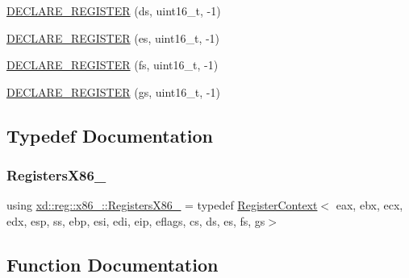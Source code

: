 \begin{DoxyCompactItemize}
\item 
\mbox{\hyperlink{namespacexd_1_1reg_1_1x86__32_a330d6a1a7c2412c9ebac4c0a554d0a84}{D\+E\+C\+L\+A\+R\+E\+\_\+\+R\+E\+G\+I\+S\+T\+ER}} (ds, uint16\+\_\+t, -\/1)
\item 
\mbox{\hyperlink{namespacexd_1_1reg_1_1x86__32_a8100107c4aaf6a80daa9140257b81c64}{D\+E\+C\+L\+A\+R\+E\+\_\+\+R\+E\+G\+I\+S\+T\+ER}} (es, uint16\+\_\+t, -\/1)
\item 
\mbox{\hyperlink{namespacexd_1_1reg_1_1x86__32_a97ca8ad3032cc6a9872c53f481ca3966}{D\+E\+C\+L\+A\+R\+E\+\_\+\+R\+E\+G\+I\+S\+T\+ER}} (fs, uint16\+\_\+t, -\/1)
\item 
\mbox{\hyperlink{namespacexd_1_1reg_1_1x86__32_ac8f74e0bde94a441669a573c0f013d08}{D\+E\+C\+L\+A\+R\+E\+\_\+\+R\+E\+G\+I\+S\+T\+ER}} (gs, uint16\+\_\+t, -\/1)
\end{DoxyCompactItemize}


\subsection{Typedef Documentation}
\mbox{\label{namespacexd_1_1reg_1_1x86__32_a28d948c5cde56fbf4f6ea71cea3d595b}} 
\subsubsection{\texorpdfstring{Registers\+X86\+\_}{RegistersX86\_32}}
{\footnotesize\ttfamily using \mbox{\hyperlink{namespacexd_1_1reg_1_1x86__32_a28d948c5cde56fbf4f6ea71cea3d595b}{xd\+::reg\+::x86\+\_\+::\+Registers\+X86\+\_}} = typedef \mbox{\hyperlink{namespacexd_1_1reg_ab6608c02ef554f7a9a48519600fb6707}{Register\+Context}}$<$ eax, ebx, ecx, edx, esp, ss, ebp, esi, edi, eip, eflags, cs, ds, es, fs, gs$>$}



\subsection{Function Documentation}
\mbox{\label{namespacexd_1_1reg_1_1x86__32_ac26a4d140e439b42678cd446fe173543}} 
